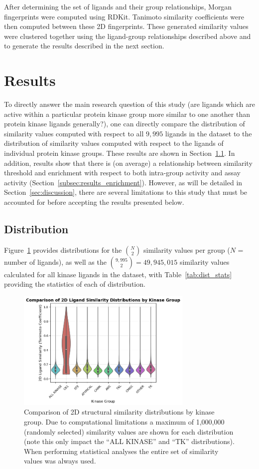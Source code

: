 \documentclass[11pt]{article}
\begin{document}
After determining the set of ligands and their group relationships, Morgan fingerprints were computed using RDKit. 
Tanimoto similarity coefficients were then computed between these 2D fingerprints. 
These generated similarity values were clustered together using the ligand-group relationships described above and to generate the results described in the next section.
\section{Results}
To directly answer the main research question of this study (are ligands which are active within a particular protein kinase group more similar to one another than protein kinase ligands generally?), one can directly compare the distribution of similarity values computed with respect to all $9,995$ ligands in the dataset to the distribution of similarity values computed with respect to the ligands of individual protein kinase groups. 
These results are shown in Section~\ref{subsec:dist_results}. 
In addition, results show that there is (on average) a relationship between similarity threshold and enrichment with respect to both intra-group activity and assay activity (Section~\ref{subsec:results_enrichment}). 
However, as will be detailed in Section~\ref{sec:discussion}, there are several limitations to this study that must be accounted for before accepting the results presented below.
 
\subsection{Distribution}\label{subsec:dist_results}
Figure~\ref{fig:violin_plot} provides distributions for the ${N\choose 2}$ similarity values per group ($N$ = number of ligands), as well as the ${9,995 \choose 2} = 49,945,015$ similarity values calculated for all kinase ligands in the dataset, with Table~\ref{tab:dist_stats} providing the statistics of each of distribution. 
\begin{figure}[H]
    \centering
    \includegraphics[width=0.75\textwidth]{../figures/violin_plot.png}
    \caption{Comparison of 2D structural similarity distributions by kinase group. Due to computational limitations a maximum of 1,000,000 (randomly selected) similarity values are shown for each distribution (note this only impact the ``ALL KINASE'' and ``TK'' distributions). When performing statistical analyses the entire set of similarity values was always used.}\label{fig:violin_plot}
\end{figure}
\end{document}
